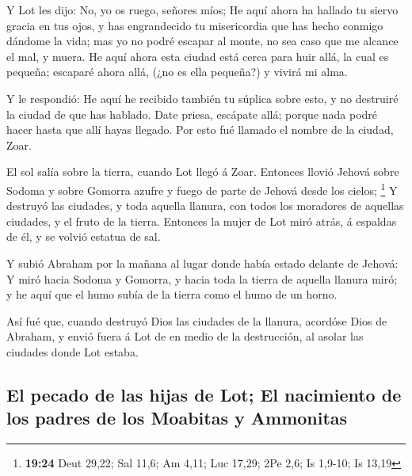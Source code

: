  Y Lot les dijo: No, yo os ruego, señores míos;
 He aquí ahora ha hallado tu siervo gracia en tus ojos, y
has engrandecido tu misericordia que has hecho conmigo dándome la vida;
mas yo no podré escapar al monte, no sea caso que me alcance el mal, y
muera.  He aquí ahora esta ciudad está cerca para huir
allá, la cual es pequeña; escaparé ahora allá, (¿no es ella pequeña?) y
vivirá mi alma.

 Y le respondió: He aquí he recibido también tu súplica
sobre esto, y no destruiré la ciudad de que has hablado. 
Date priesa, escápate allá; porque nada podré hacer hasta que allí hayas
llegado. Por esto fué llamado el nombre de la ciudad, Zoar.

 El sol salía sobre la tierra, cuando Lot llegó á Zoar.
 Entonces llovió Jehová sobre Sodoma y sobre Gomorra azufre
y fuego de parte de Jehová desde los cielos; \footnote{\textbf{19:24}
  Deut 29,22; Sal 11,6; Am 4,11; Luc 17,29; 2Pe 2,6; Is 1,9-10; Is 13,19}
 Y destruyó las ciudades, y toda aquella llanura, con todos
los moradores de aquellas ciudades, y el fruto de la tierra.
 Entonces la mujer de Lot miró atrás, á espaldas de él, y
se volvió estatua de sal.

 Y subió Abraham por la mañana al lugar donde había estado
delante de Jehová:  Y miró hacia Sodoma y Gomorra, y hacia
toda la tierra de aquella llanura miró; y he aquí que el humo subía de
la tierra como el humo de un horno.

 Así fué que, cuando destruyó Dios las ciudades de la
llanura, acordóse Dios de Abraham, y envió fuera á Lot de en medio de la
destrucción, al asolar las ciudades donde Lot estaba.

\hypertarget{el-pecado-de-las-hijas-de-lot-el-nacimiento-de-los-padres-de-los-moabitas-y-ammonitas}{%
\subsection{El pecado de las hijas de Lot; El nacimiento de los padres
de los Moabitas y
Ammonitas}\label{el-pecado-de-las-hijas-de-lot-el-nacimiento-de-los-padres-de-los-moabitas-y-ammonitas}}

